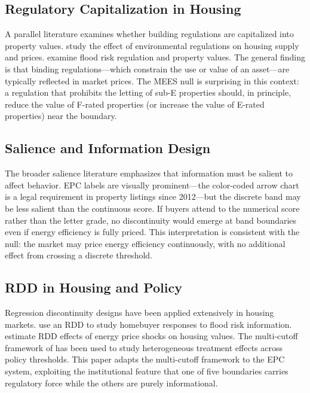 \documentclass[12pt]{article}
\begin{document}
\subsection{Regulatory Capitalization in Housing}

A parallel literature examines whether building regulations are capitalized into property values. \citet{best2020housing} study the effect of environmental regulations on housing supply and prices. \citet{surminski2017flood} examine flood risk regulation and property values. The general finding is that binding regulations---which constrain the use or value of an asset---are typically reflected in market prices. The MEES null is surprising in this context: a regulation that prohibits the letting of sub-E properties should, in principle, reduce the value of F-rated properties (or increase the value of E-rated properties) near the boundary.

\subsection{Salience and Information Design}

The broader salience literature \citep{chetty2009salience} emphasizes that information must be salient to affect behavior. EPC labels are visually prominent---the color-coded arrow chart is a legal requirement in property listings since 2012---but the discrete band may be less salient than the continuous score. If buyers attend to the numerical score rather than the letter grade, no discontinuity would emerge at band boundaries even if energy efficiency is fully priced. This interpretation is consistent with the null: the market may price energy efficiency continuously, with no additional effect from crossing a discrete threshold.

\subsection{RDD in Housing and Policy}

Regression discontinuity designs have been applied extensively in housing markets. \citet{ghosh2024homebuyers} use an RDD to study homebuyer responses to flood risk information. \citet{romani2024crisis} estimate RDD effects of energy price shocks on housing values. The multi-cutoff framework of \citet{cattaneo2016interpreting} has been used to study heterogeneous treatment effects across policy thresholds. This paper adapts the multi-cutoff framework to the EPC system, exploiting the institutional feature that one of five boundaries carries regulatory force while the others are purely informational.
\end{document}
